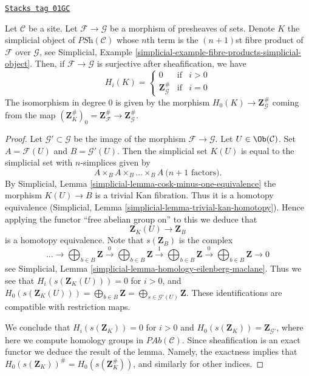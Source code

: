 \begin{lemma}
\label{hypercovering-lemma-compare-cosk0}
\href{https://stacks.math.columbia.edu/tag/01GC}{\texttt{Stacks tag 01GC}}

Let $\mathcal{C}$ be a site.
Let $\mathcal{F} \to \mathcal{G}$ be a morphism
of presheaves of sets. Denote $K$ the simplicial
object of $\textit{PSh}(\mathcal{C})$ whose $n$th
term is the $(n + 1)$st fibre product of $\mathcal{F}$
over $\mathcal{G}$, see
Simplicial, Example \ref{simplicial-example-fibre-products-simplicial-object}.
Then, if $\mathcal{F} \to \mathcal{G}$ is surjective after
sheafification, we have
$$
H_i(K) =
\left\{
\begin{matrix}
0 & \text{if} & i > 0\\
\mathbf{Z}_\mathcal{G}^\# & \text{if} & i = 0
\end{matrix}
\right.
$$
The isomorphism in degree $0$ is given by the
morphism $H_0(K) \to \mathbf{Z}_\mathcal{G}^\#$
coming from the map $(\mathbf{Z}_K^\#)_0 =
\mathbf{Z}_\mathcal{F}^\# \to \mathbf{Z}_\mathcal{G}^\#$.
\end{lemma}

\begin{proof}
Let $\mathcal{G}' \subset \mathcal{G}$ be the image of
the morphism $\mathcal{F} \to \mathcal{G}$.
Let $U \in \Ob(\mathcal{C})$. Set
$A = \mathcal{F}(U)$ and $B = \mathcal{G}'(U)$.
Then the simplicial set $K(U)$ is equal to the simplicial
set with $n$-simplices given by
$$
A \times_B A \times_B \ldots \times_B A\ (n + 1 \text{ factors)}.
$$
By Simplicial, Lemma \ref{simplicial-lemma-cosk-minus-one-equivalence}
the morphism $K(U) \to B$ is a trivial Kan fibration.
Thus it is a homotopy equivalence
(Simplicial, Lemma \ref{simplicial-lemma-trivial-kan-homotopy}).
Hence applying the functor ``free abelian group on'' to this
we deduce that
$$
\mathbf{Z}_K(U) \longrightarrow \mathbf{Z}_B
$$
is a homotopy equivalence. Note that $s(\mathbf{Z}_B)$ is
the complex
$$
\ldots \to
\bigoplus\nolimits_{b \in B}\mathbf{Z} \xrightarrow{0}
\bigoplus\nolimits_{b \in B}\mathbf{Z} \xrightarrow{1}
\bigoplus\nolimits_{b \in B}\mathbf{Z} \xrightarrow{0}
\bigoplus\nolimits_{b \in B}\mathbf{Z} \to 0
$$
see Simplicial, Lemma \ref{simplicial-lemma-homology-eilenberg-maclane}.
Thus we see that
$H_i(s(\mathbf{Z}_K(U))) = 0$ for $i > 0$, and
$H_0(s(\mathbf{Z}_K(U))) = \bigoplus_{b \in B}\mathbf{Z}
= \bigoplus_{s \in \mathcal{G}'(U)} \mathbf{Z}$.
These identifications are compatible with restriction
maps.

\medskip\noindent
We conclude that $H_i(s(\mathbf{Z}_K)) = 0$ for $i > 0$ and
$H_0(s(\mathbf{Z}_K)) = \mathbf{Z}_{\mathcal{G}'}$, where here
we compute homology groups in $\textit{PAb}(\mathcal{C})$. Since
sheafification is an exact functor we deduce the result
of the lemma. Namely, the exactness implies
that $H_0(s(\mathbf{Z}_K))^\# = H_0(s(\mathbf{Z}_K^\#))$,
and similarly for other indices.
\end{proof}

